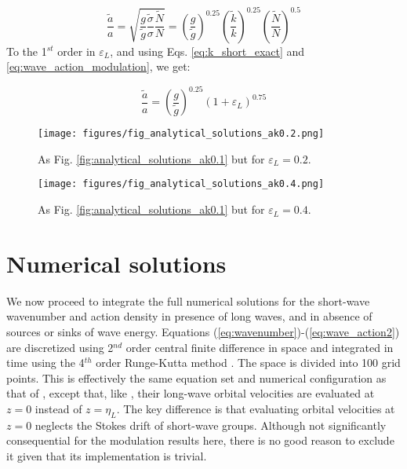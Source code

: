 \documentclass[lineno]{jfm}
\begin{document}
\begin{equation}
\label{eq:wave_amplitude_modulation}
\dfrac{\widetilde{a}}{a} = \sqrt{
  \dfrac{g}{\widetilde{g}}
  \dfrac{\widetilde{\sigma}}{\sigma}
  \dfrac{\widetilde{N}}{N}}
=
  \left( \dfrac{g}{\widetilde{g}} \right)^{0.25}
  \left( \dfrac{\widetilde{k}}{k} \right)^{0.25}
  \left( \dfrac{\widetilde{N}}{N} \right)^{0.5}
\end{equation}
To the 1$^{st}$ order in $\varepsilon_L$, and using Eqs. \ref{eq:k_short_exact}
and \ref{eq:wave_action_modulation}, we get:

\begin{equation}
\label{eq:wave_amplitude_modulation_order1}
\dfrac{\widetilde{a}}{a} = 
  \left( \dfrac{g}{\widetilde{g}} \right)^{0.25}
  \left( 1 + \varepsilon_L \right)^{0.75}
\end{equation}

\begin{figure}
\centering
\texttt{[image: figures/fig\_analytical\_solutions\_ak0.2.png]}
\caption{As Fig. \ref{fig:analytical_solutions_ak0.1} but for $\varepsilon_L = 0.2$.}
\label{fig:analytical_solutions_ak0.2}
\end{figure}

\begin{figure}
\centering
\texttt{[image: figures/fig\_analytical\_solutions\_ak0.4.png]}
\caption{As Fig. \ref{fig:analytical_solutions_ak0.1} but for $\varepsilon_L = 0.4$.}
\label{fig:analytical_solutions_ak0.4}
\end{figure}

\section{Numerical solutions}
\label{section:numerical_solutions}

We now proceed to integrate the full numerical solutions for the short-wave
wavenumber and action density in presence of long waves, and in absence of
sources or sinks of wave energy.
Equations (\ref{eq:wavenumber})-(\ref{eq:wave_action2}) are discretized using
2$^{nd}$  order central finite difference in space and integrated in time using the
4$^{th}$ order Runge-Kutta method \citep{butcher1996runge}.
The space is divided into 100 grid points.
This is effectively the same equation set and numerical configuration as that of
\citet{peureux2021unsteady}, except that, like \citet{longuet1960changes}, their
long-wave orbital velocities are evaluated at $z=0$ instead of $z=\eta_L$.
The key difference is that evaluating orbital velocities at $z=0$ neglects the
Stokes drift of short-wave groups.
Although not significantly consequential for the modulation results here, there
is no good reason to exclude it given that its implementation is trivial.
\end{document}
